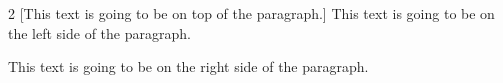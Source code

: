 
\begin{multicols}{2} [This text is going to be on top of the paragraph.]
	This text is going to be on the left side of the paragraph.

	\columnbreak

	This text is going to be on the right side of the paragraph.
\end{multicols}
